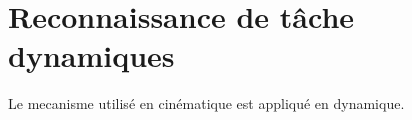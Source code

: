 \chapter{Reconnaissance de t\^ache dynamiques}
\label{chap:6:sec:intro}

Le mecanisme utilis\'e en cin\'ematique est appliqu\'e en
dynamique.
